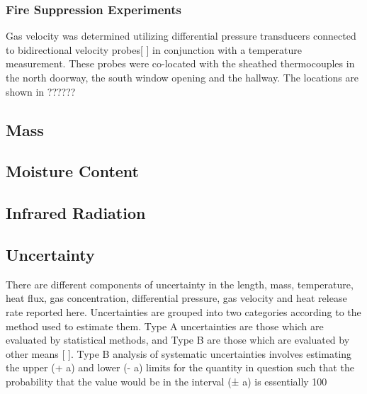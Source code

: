 \documentclass[12pt,oneside]{book}
\begin{document}
\subsubsection{Fire Suppression Experiments}
\label{subsubsec:Fire_Suppression_Gas_Velocity_Instrumentation}

Gas velocity was determined utilizing differential pressure transducers connected to bidirectional velocity probes[ ] in conjunction with a temperature measurement.  These probes were co-located with the sheathed thermocouples in the north doorway, the south window opening and the hallway.  The locations are shown in ??????

\subsection{Mass}
\label{subsec:Mass}

\subsection{Moisture Content}
\label{subsec:Moisture_Content}

\subsection{Infrared Radiation}
\label{subsec:Infrared_Radiation}

\subsection{Uncertainty}
\label{subsec:Uncertainty}

There are different components of uncertainty in the length, mass, temperature, heat flux, gas concentration, differential pressure, gas velocity and heat release rate reported here. Uncertainties are grouped into two categories according to the method used to estimate them. Type A uncertainties are those which are evaluated by statistical methods, and Type B are those which are evaluated by other means  [ ]. Type B analysis of systematic uncertainties involves estimating the upper (+ a) and lower (- a) limits for the quantity in question such that the probability that the value would be in the interval (± a) is essentially 100 %
\end{document}
